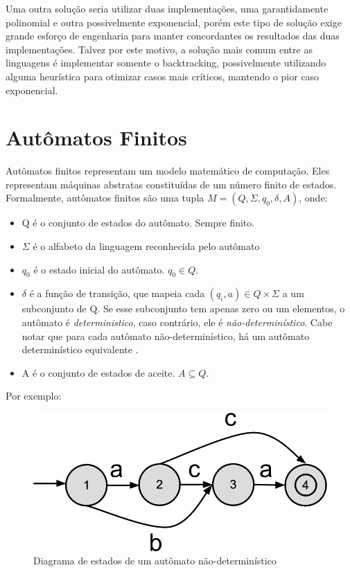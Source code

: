 \documentclass[a4paper,12pt,oneside,onecolumn]{uerj}
\begin{document}
Uma outra solução seria utilizar duas implementações, uma garantidamente polinomial e outra possivelmente exponencial, porém este tipo de solução exige grande esforço de engenharia para manter concordantes os resultados das duas implementações. Talvez por este motivo, a solução mais comum entre as linguagens é implementar somente o backtracking, possivelmente utilizando alguma heurística para otimizar casos mais críticos, mantendo o pior caso exponencial.

\section{Autômatos Finitos}

Autômatos finitos representam um modelo matemático de computação. Eles representam máquinas abstratas constituídas de um número finito de estados. Formalmente, autômatos finitos são uma tupla $M = (Q, \Sigma, q_0, \delta, A)$, onde:

\begin{itemize}
    \item Q é o conjunto de estados do autômato. Sempre finito.
    \item $\Sigma$ é o alfabeto da linguagem reconhecida pelo autômato
    \item $q_0$ é o estado inicial do autômato. $q_0 \in Q$.
    \item $\delta$ é a função de transição, que mapeia cada $(q_i, a) \in Q \times \Sigma$ a um subconjunto de Q. Se esse subconjunto tem apenas zero ou um elementos, o autômato é \emph{deterministico}, caso contrário, ele é \emph{não-determinístico}. Cabe notar que para cada autômato não-determinístico, há um autômato determinístico equivalente \cite{bib:Rabin59}.
    \item A é o conjunto de estados de aceite. $A \subseteq Q$.
\end{itemize}

Por exemplo:

\begin{figure}[ht]
  \centering
  \includegraphics[scale=0.3]{figures/exemplo_automato_numerado.png}
  \caption{Diagrama de estados de um autômato não-determinístico}
  \label{fig:exemplo_automato_numerado}
\end{figure}
\end{document}
